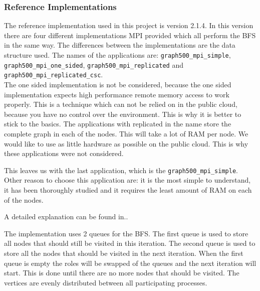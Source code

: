 \subsubsection{Reference Implementations}

The reference implementation\cite{graph500-code} used in this project is version 2.1.4. In this version there are four different implementations MPI provided which all perform the BFS in the same way. The differences between the implementations are the data structure used. The names of the applications are: \texttt{graph500\_mpi\_simple}, \texttt{graph500\_mpi\_one\_sided}, \texttt{graph500\_mpi\_replicated} and \texttt{graph500\_mpi\_replicated\_csc}.
\\ 
The one sided implementation is not be considered, because the one sided implementation expects high performance remote memory access to work properly. This is a technique which can not be relied on in the public cloud, because you have no control over the environment. This is why it is better to stick to the basics. The applications with replicated in the name store the complete graph in each of the nodes. This will take a lot of RAM per node. We would like to use as little hardware as possible on the public cloud. This is why these applications were not considered.

This leaves us with the last application, which is the \texttt{graph500\_mpi\_simple}. Other reason to choose this application are: it is the most simple to understand, it has been thoroughly studied and it requires the least amount of RAM on each of the nodes. 

A detailed explanation can be found in.\cite{suzumura2011performance}.

The implementation uses 2 queues for the BFS. The first queue is used to store all nodes that should still be visited in this iteration. The second queue is used to store all the nodes that should be visited in the next iteration. When the first queue is empty the roles will be swapped of the queues and the next iteration will start. This is done until there are no more nodes that should be visited. The vertices are evenly distributed between all participating processes.

